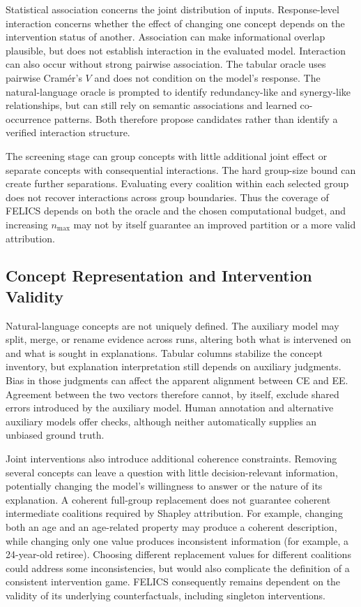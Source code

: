 Statistical association concerns the joint distribution of inputs. Response-level interaction concerns whether the effect of changing one concept depends on the intervention status of another. Association can make informational overlap plausible, but does not establish interaction in the evaluated model. Interaction can also occur without strong pairwise association. The tabular oracle uses pairwise Cram\'er's $V$ and does not condition on the model's response. The natural-language oracle is prompted to identify redundancy-like and synergy-like relationships, but can still rely on semantic associations and learned co-occurrence patterns. Both therefore propose candidates rather than identify a verified interaction structure.

The screening stage can group concepts with little additional joint effect or separate concepts with consequential interactions. The hard group-size bound can create further separations. Evaluating every coalition within each selected group does not recover interactions across group boundaries. Thus the coverage of FELICS depends on both the oracle and the chosen computational budget, and increasing $n_{\max}$ may not by itself guarantee an improved partition or a more valid attribution.

\subsection{Concept Representation and Intervention Validity}

Natural-language concepts are not uniquely defined. The auxiliary model may split, merge, or rename evidence across runs, altering both what is intervened on and what is sought in explanations. Tabular columns stabilize the concept inventory, but explanation interpretation still depends on auxiliary judgments. Bias in those judgments can affect the apparent alignment between CE and EE. Agreement between the two vectors therefore cannot, by itself, exclude shared errors introduced by the auxiliary model. Human annotation and alternative auxiliary models offer checks, although neither automatically supplies an unbiased ground truth.

Joint interventions also introduce additional coherence constraints. Removing several concepts can leave a question with little decision-relevant information, potentially changing the model's willingness to answer or the nature of its explanation. A coherent full-group replacement does not guarantee coherent intermediate coalitions required by Shapley attribution. For example, changing both an age and an age-related property may produce a coherent description, while changing only one value produces inconsistent information (for example, a 24-year-old retiree). Choosing different replacement values for different coalitions could address some inconsistencies, but would also complicate the definition of a consistent intervention game. FELICS consequently remains dependent on the validity of its underlying counterfactuals, including singleton interventions.

